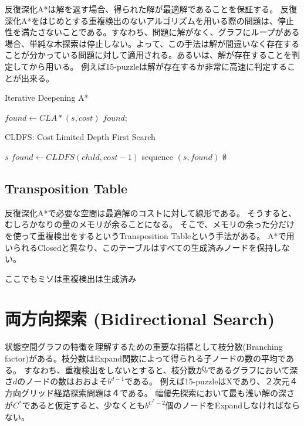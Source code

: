 \documentclass{report}
\begin{document}
反復深化A*は解を返す場合、得られた解が最適解であることを保証する。
反復深化A*をはじめとする重複検出のないアルゴリズムを用いる際の問題は、停止性を満たさないことである。すなわち、問題に解がなく、グラフにループがある場合、単純な木探索は停止しない。よって、この手法は解が間違いなく存在することが分かっている問題に対して適用される。あるいは、解が存在することを判定してから用いる。
例えば15-puzzleは解が存在するか非常に高速に判定することが出来る。



\begin{algorithm}
\caption{Iterative Deepening A*}
\label{alg:iterative-deepening-astar}
	 {
		$found \leftarrow CLA*(s, cost)$\;
		 {
			\Return $found$;
		}
	}
\end{algorithm}

\begin{algorithm}
\caption{CLDFS: Cost Limited Depth First Search}
\label{alg:implicit-graph-search}
	 {
		\Return $s$\;
	}
	 {
		$found \leftarrow CLDFS(child, cost - 1)$\;
		 {
			\Return sequence $(s, found)$\;
		}
	}
	\Return $\emptyset$\;
\end{algorithm}

\subsection{Transposition Table}

反復深化A*で必要な空間は最適解のコストに対して線形である。
そうすると、むしろかなりの量のメモリが余ることになる。
そこで、メモリの余った分だけを使って重複検出をするというTransposition Tableという手法がある。
A*で用いられるClosedと異なり、このテーブルはすべての生成済みノードを保持しない。

ここでもミソは重複検出は生成済み

\section{両方向探索 (Bidirectional Search)}
\label{sec:bidirectional-search}

状態空間グラフの特徴を理解するための重要な指標として枝分数(Branching factor)がある。枝分数はExpand関数によって得られる子ノードの数の平均である。
すなわち、重複検出をしないとすると、枝分数が$b$であるグラフにおいて深さ$d$のノードの数はおおよそ$b^{d-1}$である。
例えば15-puzzleはXであり、２次元４方向グリッド経路探索問題は４である。
幅優先探索において最も浅い解の深さが$C^*$であると仮定すると、少なくとも$b^{C^*-2}$個のノードをExpandしなければならない。
\end{document}
